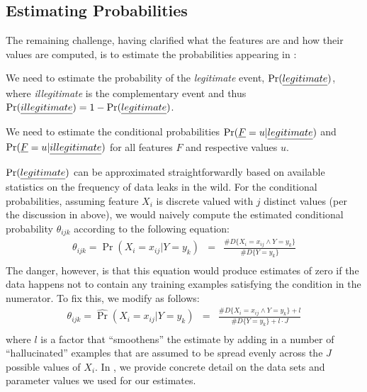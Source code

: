\subsection{Estimating Probabilities}\label{Se:estprob}

The remaining challenge, having clarified what the features are and how their values are computed, is to estimate the probabilities appearing in :
\begin{compactitem}
	\item We need to estimate the probability of the \emph{legitimate} event, $\Pr(\emph{legitimate})$, where \emph{illegitimate} is the complementary event and thus
	$\Pr(\emph{illegitimate}) = 1 - \Pr(\emph{legitimate})$.
	\item We need to estimate the conditional probabilities $\Pr(\emph{F} = u | \emph{legitimate})$ and $\Pr(\emph{F} = u | \emph{illegitimate})$ for all features $F$
	and respective values $u$.
\end{compactitem}

$\Pr(\emph{legitimate})$ can be approximated straightforwardly based on available statistics on the frequency of data leaks in the wild. For the conditional probabilities, assuming feature $X_i$ is discrete valued with $j$ distinct values (per the discussion in  above), we would naively compute the
estimated conditional probability $\theta_{ijk}$ according to the following equation:
\begin{equation}\label{Eq:naiveEstimate}
	\begin{array}{lcr}
		\theta_{ijk} = \widehat{\Pr}(X_i = x_{ij} | Y=y_k) & = & \frac{\# D \{ X_i = x_{ij} \wedge Y = y_k \}}{\# D \{ Y = y_k \}} \\
	\end{array}
\end{equation}
The danger, however, is that this equation would produce estimates of zero if the data happens not to contain any training examples satisfying the condition in the numerator. To fix this, we modify  as follows:
\begin{equation}\label{Eq:smoothEstimate}
	\begin{array}{lcr}
		\theta_{ijk} = \widehat{\Pr}(X_i = x_{ij} | Y=y_k) & = & \frac{\# D \{ X_i = x_{ij} \wedge Y = y_k \} + l}{\# D \{ Y = y_k \} + l \cdot J} \\
	\end{array}
\end{equation}
where $l$ is a factor that ``smoothens'' the estimate by adding in a number of ``hallucinated'' examples that are assumed to be spread evenly across the $J$ possible values of $X_i$. In , we provide concrete detail on the data sets and parameter values we used for our estimates.


